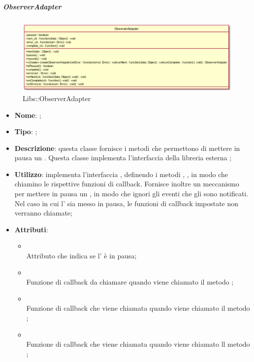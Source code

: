 \hypertarget{ObserverAdapter_label}{\subparagraph{ObserverAdapter}}
\begin{figure}[h]
	\centering
	\includegraphics[width=\textwidth,height=\textheight,keepaspectratio]{images/ClassObserverAdapter.png}
	\caption{Libs::ObserverAdapter}
\end{figure}
\begin{itemize}
	\item \textbf{Nome}: ;
	\item \textbf{Tipo}: ;
	\item \textbf{Descrizione}: questa classe fornisce i metodi che permettono di mettere in pausa un .
	Questa classe implementa l'interfaccia della libreria esterna ;
	\item \textbf{Utilizzo}: implementa l'interfaccia , definendo i metodi , ,  in modo che chiamino le rispettive funzioni di callback. Fornisce inoltre un meccanismo per mettere in pausa un , in modo che ignori gli eventi che gli sono notificati. Nel caso in cui l' sia messo in pausa, le funzioni di callback impostate non verranno chiamate;
	\item \textbf{Attributi}:
	\begin{itemize}
		\item[]  \\
		Attributo che indica se l' è in pausa;
		\item[]  \\
		Funzione di callback da chiamare quando viene chiamato il metodo ;
		\item[]  \\
		Funzione di callback che viene chiamata quando viene chiamato il metodo ;
		\item[]  \\
		Funzione di callback che viene chiamata quando viene chiamato ll metodo ;

\end{itemize}
\end{itemize}
